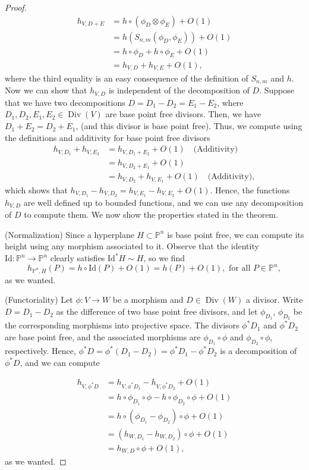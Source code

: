 \documentclass[a4paper, 12pt]{amsart}
\theoremstyle{definition}
\theoremstyle{plain}
\theoremstyle{plain}
\theoremstyle{plain}
\theoremstyle{plain}
\theoremstyle{remark}
\theoremstyle{remark}
\theoremstyle{plain}
\DeclareMathOperator{\Div}{Div}
\begin{document}
\begin{proof}
		\begin{align*}
			h_{V,D+E}&=h\circ(\phi_D\otimes\phi_E)+O(1)\\
			&=h(S_{n,m}(\phi_D,\phi_E))+O(1)\\
			&=h\circ\phi_D+h\circ\phi_E+O(1)\\
			&=h_{V,D}+h_{V,E}+O(1),
		\end{align*}
		where the third equality is an easy consequence of the definition of $S_{n,m}$ and $h$. Now we can show that $h_{V,D}$ is independent of the decomposition of $D$. Suppose that we have two decompositions $D=D_1-D_2=E_1-E_2$, where $D_1,D_2,E_1,E_2\in\Div(V)$ are base point free divisors. Then, we have $D_1+E_2=D_2+E_1$, (and this divisor is base point free). Thus, we compute using the definitions and additivity for base point free divisors
		\begin{align*}
			h_{V,D_1}+h_{V,E_2}&=h_{V,D_1+E_2}+O(1)\quad\text{(Additivity)}\\
			&=h_{V,D_2+E_1}+O(1)\\
			&=h_{V,D_2}+h_{V,E_1}+O(1)\quad\text{(Additivity)},
		\end{align*}
		which shows that $h_{V,D_1}-h_{V,D_2}=h_{V,E_1}-h_{V,E_2}+O(1)$. Hence, the functions $h_{V,D}$ are well defined up to bounded functions, and we can use any decomposition of $D$ to compute them. We now show the properties stated in the theorem.
		
		(Normalization) Since a hyperplane $H\subset\mathbb{P}^n$ is base point free, we can compute its height using any morphism associated to it. Observe that the identity $\text{Id}:\mathbb{P}^n\rightarrow\mathbb{P}^n$ clearly satisfies $\text{Id}^*H\sim H$, so we find
		\begin{equation*}
			h_{\mathbb{P}^n,H}(P)=h\circ\text{Id}(P)+O(1)=h(P)+O(1), \text{ for all }P\in \mathbb{P}^n,
		\end{equation*}
		as we wanted.
		
		(Functoriality) Let $\phi:V\rightarrow W$ be a morphism and $D\in\Div(W)$ a divisor. Write $D=D_1-D_2$ as the difference of two base point free divisors, and let $\phi_{D_1}$, $\phi_{D_2}$ be the corresponding morphisms into projective space. The divisors $\phi^*D_1$ and $\phi^*D_2$ are base point free, and the associated morphisms are $\phi_{D_1}\circ\phi$ and $\phi_{D_2}\circ\phi$, respectively. Hence, $\phi^*D=\phi^*(D_1-D_2)=\phi^*D_1-\phi^*D_2$ is a decomposition of $\phi^*D$, and we can compute
		
		\begin{align*}
			h_{V,\phi^*D}&=h_{V,\phi^*D_1}-h_{V,\phi^*D_2}+O(1)\\
			&=h\circ \phi_{D_1}\circ\phi-h\circ\phi_{D_2}\circ\phi+O(1)\\
			&=h\circ(\phi_{D_1}-\phi_{D_2})\circ\phi+O(1)\\
			&=(h_{W,D_1}-h_{W,D_2})\circ\phi+O(1)\\
			&=h_{W,D}\circ\phi +O(1),
		\end{align*}
		as we wanted.
		

\end{proof}
\end{document}
